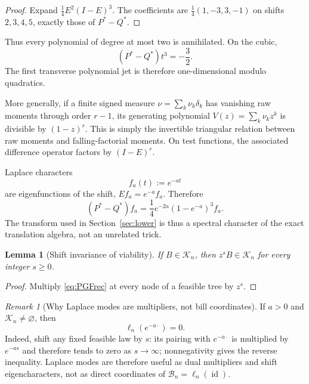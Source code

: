 \documentclass[11pt,a4paper]{article}
\newtheorem{lemma}[theorem]{Lemma}
\theoremstyle{definition}
\theoremstyle{remark}
\newtheorem{remark}[theorem]{Remark}
\newcommand{\cK}{\mathcal K}
\newcommand{\cB}{\mathcal B}
\newcommand{\id}{\operatorname{id}}
\begin{document}
\begin{proof}
Expand \(\frac14E^2(I-E)^3\).  The coefficients are
\(\frac14(1,-3,3,-1)\) on shifts \(2,3,4,5\), exactly those of
\(P^*-Q^*\).
\end{proof}

Thus every polynomial of degree at most two is annihilated.  On the cubic,
\begin{equation}
 (P^*-Q^*)t^3=-\frac32.
 \label{eq:cubicpoly}
\end{equation}
The first transverse polynomial jet is therefore one-dimensional modulo
quadratics.

More generally, if a finite signed measure \(\nu=\sum_k\nu_k\delta_k\) has
vanishing raw moments through order \(r-1\), its generating polynomial
\(V(z)=\sum_k\nu_kz^k\) is divisible by \((1-z)^r\).  This is simply the
invertible triangular relation between raw moments and falling-factorial
moments.  On test functions, the associated difference operator factors by
\((I-E)^r\).

Laplace characters
\[
 f_a(t):=e^{-at}
\]
are eigenfunctions of the shift, \(Ef_a=e^{-a}f_a\).  Therefore
\begin{equation}
 \boxed{
 (P^*-Q^*)f_a
 =\frac14e^{-2a}(1-e^{-a})^3f_a.
 }
 \label{eq:laplaceSymbol}
\end{equation}
The transform used in Section~\ref{sec:lower} is thus a spectral character of
the exact translation algebra, not an unrelated trick.

\begin{lemma}[Shift invariance of viability]
If \(B\in\cK_n\), then \(z^sB\in\cK_n\) for every integer \(s\ge0\).
\end{lemma}

\begin{proof}
Multiply \eqref{eq:PGFrec} at every node of a feasible tree by \(z^s\).
\end{proof}

\begin{remark}[Why Laplace modes are multipliers, not bill coordinates]
If \(a>0\) and \(\cK_n\neq\varnothing\), then
\[
 \ell_n(e^{-a\cdot})=0.
\]
Indeed, shift any fixed feasible law by \(s\): its pairing with
\(e^{-a\cdot}\) is multiplied by \(e^{-as}\) and therefore tends to zero as
\(s\to\infty\); nonnegativity gives the reverse inequality.  Laplace modes
are therefore useful as dual multipliers and shift eigencharacters, not as
direct coordinates of \(\cB_n=\ell_n(\id)\).
\end{remark}
\end{document}
